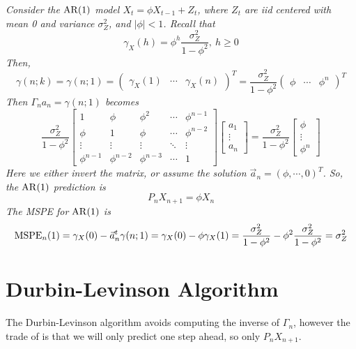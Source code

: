 \begin{example}[AR(1)]
    \emph{
        Consider the $\operatorname{AR}(1)$ model $X_t = \phi X_{t-1} + Z_t$, where $Z_t$ are iid centered with mean 0 and variance $\sigma_Z^2$, and $|\phi| < 1$. Recall that 
        \[\gamma_X(h) = \phi^h\frac{\sigma_Z^2}{1-\phi^2}, \ h \geq 0\]
        Then, 
        \[\gamma(n;k) = \gamma(n;1) = \begin{pmatrix}
            \gamma_X(1) & \cdots & \gamma_X(n)
        \end{pmatrix}^T = \frac{\sigma_Z^2}{1-\phi^2}\begin{pmatrix}
            \phi & \cdots & \phi^n
        \end{pmatrix}^T\]
        Then $\Gamma_n a_n = \gamma(n;1)$ becomes
        \[\frac{\sigma_Z^2}{1-\phi^2}\begin{bmatrix}
            1 & \phi & \phi^2 & \cdots & \phi^{n-1}\\
            \phi & 1 & \phi & \cdots & \phi^{n-2}\\
            \vdots & \vdots & \vdots & \ddots & \vdots \\
            \phi^{n-1} & \phi^{n-2} & \phi^{n-3} & \cdots & 1
        \end{bmatrix}\begin{bmatrix}
            a_1\\ \vdots \\ a_n
        \end{bmatrix} = \frac{\sigma_Z^2}{1-\phi^2}\begin{bmatrix}
            \phi \\ \vdots \\ \phi^n
        \end{bmatrix}\]
        Here we either invert the matrix, or assume the solution $\vec{a}_n =(\phi, \cdots, 0)^T$. So, the $\operatorname{AR}(1)$ prediction is 
        \[P_nX_{n+1} = \phi X_n\]
        The MSPE for $\operatorname{AR}(1)$ is 
        \[\operatorname{MSPE}_n(1) = \gamma_X(0) - \vec{a}_n^t\gamma(n;1) = \gamma_X(0) - \phi\gamma_X(1) = \frac{\sigma_Z^2}{1-\phi^2} - \phi^2\frac{\sigma_Z^2}{1-\phi^2} = \sigma_Z^2\]
        }
\end{example}

\section{Durbin-Levinson Algorithm}

The Durbin-Levinson algorithm avoids computing the inverse of $\Gamma_n$, however the trade of is that we will only predict one step ahead, so only $P_nX_{n+1}$.\\

